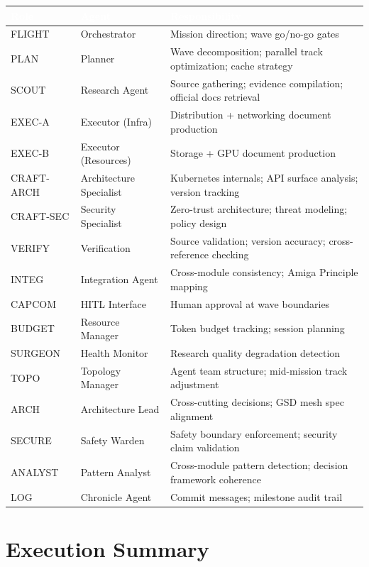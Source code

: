 \documentclass[11pt,letterpaper]{article}
\newcommand{\tableheader}[1]{\textbf{\sffamily\textcolor{white}{#1}}}
\begin{document}
\begin{center}
\begin{tabularx}{\textwidth}{L{2cm}L{2.5cm}X}
\toprule
{}
\tableheader{Role} & \tableheader{Agent} & \tableheader{Responsibility} \\
\midrule
FLIGHT & Orchestrator & Mission direction; wave go/no-go gates \\
PLAN & Planner & Wave decomposition; parallel track optimization; cache strategy \\
SCOUT & Research Agent & Source gathering; evidence compilation; official docs retrieval \\
EXEC-A & Executor (Infra) & Distribution + networking document production \\
EXEC-B & Executor (Resources) & Storage + GPU document production \\
CRAFT-ARCH & Architecture Specialist & Kubernetes internals; API surface analysis; version tracking \\
CRAFT-SEC & Security Specialist & Zero-trust architecture; threat modeling; policy design \\
VERIFY & Verification & Source validation; version accuracy; cross-reference checking \\
INTEG & Integration Agent & Cross-module consistency; Amiga Principle mapping \\
CAPCOM & HITL Interface & Human approval at wave boundaries \\
BUDGET & Resource Manager & Token budget tracking; session planning \\
SURGEON & Health Monitor & Research quality degradation detection \\
TOPO & Topology Manager & Agent team structure; mid-mission track adjustment \\
ARCH & Architecture Lead & Cross-cutting decisions; GSD mesh spec alignment \\
SECURE & Safety Warden & Safety boundary enforcement; security claim validation \\
ANALYST & Pattern Analyst & Cross-module pattern detection; decision framework coherence \\
LOG & Chronicle Agent & Commit messages; milestone audit trail \\
\bottomrule
\end{tabularx}
\end{center}

\section{Execution Summary}
\end{document}
